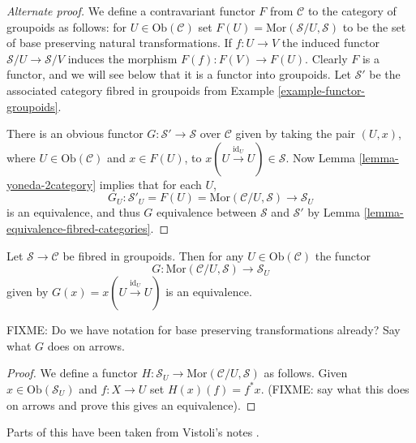 \begin{proof}[Alternate proof]
We define a contravariant functor $F$ from $\mathcal{C}$ to the
category of groupoids as follows: for $U\in \text{Ob}(\mathcal{C})$
set $F(U) = \text{Mor}(\mathcal{S}/U,\mathcal{S})$ to be the set of
base preserving natural transformations.  If $f\colon U\to V$ the
induced functor $\mathcal{S}/U\to \mathcal{S}/V$ induces the
morphism $F(f)\colon F(V)\to F(U)$.  Clearly $F$ is a functor, and
we will see below that it is a functor into groupoids.  Let
$\mathcal{S}'$ be the associated category fibred in groupoids from Example
\ref{example-functor-groupoids}.

\medskip\noindent
There is an obvious functor $G\colon \mathcal{S}'\to \mathcal{S}$
over $\mathcal{C}$ given by taking the pair $(U,x)$, where
$U\in\text{Ob}(\mathcal{C})$ and $x\in F(U)$, to
$x(U\stackrel{\text{id}_U}{\to} U) \in \mathcal{S}$.  Now Lemma
\ref{lemma-yoneda-2category} implies that for each $U$,
$$
G_U\colon \mathcal{S}'_U = F(U)= 
\text{Mor}(\mathcal{C}/U,\mathcal{S}) \to \mathcal{S}_U
$$
is an equivalence, and thus $G$ equivalence between $\mathcal{S}$ and
$\mathcal{S}'$ by Lemma \ref{lemma-equivalence-fibred-categories}.
\end{proof}

\begin{lemma}
\label{lemma-yoneda-2category}
Let $\mathcal{S}\to \mathcal{C}$ be fibred in groupoids.  Then for any
$U\in \text{Ob}(\mathcal{C})$ the functor
$$
G\colon \text{Mor}(\mathcal{C}/U,\mathcal{S}) \to \mathcal{S}_U
$$
given by $G(x) = x(U\stackrel{\text{id}_U}{\to} U)$ is an equivalence.
\end{lemma}

\noindent
FIXME: Do we have notation for base preserving transformations already?
Say what $G$ does on arrows.

\begin{proof}
We define a functor $H\colon \mathcal{S}_U \to
\text{Mor}(\mathcal{C}/U,\mathcal{S})$ as follows.  Given $x\in
\text{Ob}(\mathcal{S}_U)$ and $f\colon X\to U$ set $H(x)(f) = f^*x$.
(FIXME: say what this does on arrows and prove this gives an
equivalence).
\end{proof}
 
 Parts of this have been taken from
Vistoli's notes \cite{Vis2}.







